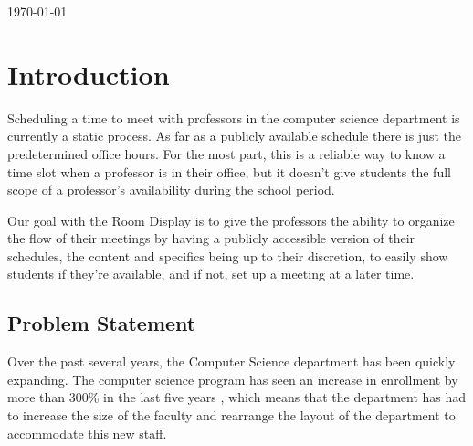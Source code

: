 \documentclass[dvips,12pt]{article}
\begin{document}
\begin{titlepage}
	\vfill\vfill\vfill %
	
	{\large\today} %
	
	
	 
	
	\vfill %
	
\end{titlepage}

\tableofcontents
\setcounter{tocdepth}{2}
\newpage


\section{Introduction}

Scheduling a time to meet with professors in the computer science department is currently a static process. As far as a publicly available schedule there is just the predetermined office hours. For the most part, this is a reliable way to know a time slot when a professor is in their office, but it doesn't give students the full scope of a professor's availability during the school period. 

Our goal with the Room Display is to give the professors the ability to organize the flow of their meetings by having a publicly accessible version of their schedules, the content and specifics being up to their discretion, to easily show students if they're available, and if not, set up a meeting at a later time.

\subsection{Problem Statement}

Over the past several years, the Computer Science department has been quickly expanding. The computer science program has seen an increase in enrollment by more than 300\% in the last five years \cite{wfarticle}, which means that the department has had to increase the size of the faculty and rearrange the layout of the department to accommodate this new staff.
\end{document}

